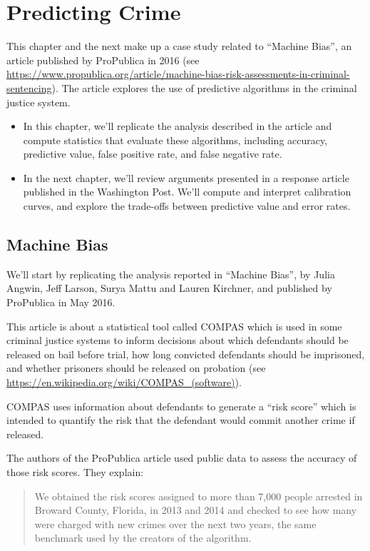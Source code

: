 \hypertarget{predicting-crime}{%
\chapter{Predicting Crime}\label{predicting-crime}}

This chapter and the next make up a case study related to ``Machine
Bias'', an article published by ProPublica in 2016 (see
\url{https://www.propublica.org/article/machine-bias-risk-assessments-in-criminal-sentencing}).
The article explores the use of predictive algorithms in the criminal
justice system.

\begin{itemize}
\item
  In this chapter, we'll replicate the analysis described in the article
  and compute statistics that evaluate these algorithms, including
  accuracy, predictive value, false positive rate, and false negative
  rate.
\item
  In the next chapter, we'll review arguments presented in a response
  article published in the Washington Post. We'll compute and interpret
  calibration curves, and explore the trade-offs between predictive
  value and error rates.
\end{itemize}

\hypertarget{machine-bias}{%
\section{Machine Bias}\label{machine-bias}}

We'll start by replicating the analysis reported in ``Machine Bias'', by
Julia Angwin, Jeff Larson, Surya Mattu and Lauren Kirchner, and
published by ProPublica in May 2016.

This article is about a statistical tool called COMPAS which is used in
some criminal justice systems to inform decisions about which defendants
should be released on bail before trial, how long convicted defendants
should be imprisoned, and whether prisoners should be released on
probation (see \url{https://en.wikipedia.org/wiki/COMPAS_(software)}).

COMPAS uses information about defendants to generate a ``risk score''
which is intended to quantify the risk that the defendant would commit
another crime if released.

The authors of the ProPublica article used public data to assess the
accuracy of those risk scores. They explain:

\begin{quote}
We obtained the risk scores assigned to more than 7,000 people arrested
in Broward County, Florida, in 2013 and 2014 and checked to see how many
were charged with new crimes over the next two years, the same benchmark
used by the creators of the algorithm.
\end{quote}

